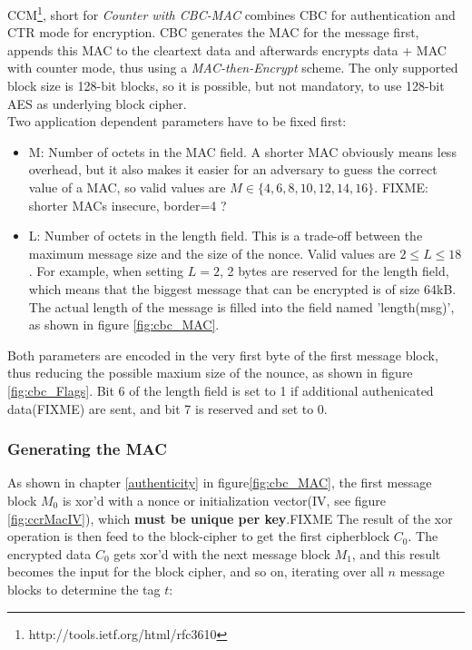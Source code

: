 CCM\footnote{http://tools.ietf.org/html/rfc3610}, short for \textit{Counter with CBC-MAC} combines CBC for authentication and CTR mode for encryption.
CBC generates the MAC for the message first, appends this MAC to the cleartext data and afterwards encrypts data + MAC with counter mode, thus using a
\textit{MAC-then-Encrypt} scheme. The only
supported block size is 128-bit blocks, so it is possible, but not mandatory, to use 128-bit AES as underlying block cipher.
\\
Two application dependent parameters have to be fixed first: 
\begin{itemize}
 \item M: Number of octets in the MAC field. A shorter MAC obviously means less overhead, but it also makes it easier for an adversary to guess the correct
 value of a MAC, so valid values are $M \in \{4, 6, 8, 10, 12, 14, 16\}$. FIXME: shorter MACs insecure, border=4 ? 
 \item L: Number of octets in the length field. This is a trade-off between the maximum message size and the size of the nonce. Valid values are $2 \leq L \leq 18$.
 For example, when setting $L = 2$, 2 bytes are reserved for the length field, which means that the biggest message that can be encrypted is of size 64kB. The actual
 length of the message is filled into the field named 'length(msg)', as shown in figure \ref{fig:cbc_MAC}.
\end{itemize}

Both parameters are encoded in the very first byte of the first message block, thus reducing the possible maxium size of the nounce, as shown in figure \ref{fig:cbc_Flags}.
Bit 6 of the length field is set to 1 if additional authenicated data(FIXME) are sent, and bit 7 is reserved and set to 0.


\subsubsection{Generating the MAC}

As shown in chapter \ref{authenticity} in figure\ref{fig:cbc_MAC}, the first message block $M_0$ is xor'd with a nonce or initialization vector(IV, see figure
\ref{fig:ccrMacIV}), which \textbf{must be unique per key}.FIXME
The result of the xor operation is then feed to the block-cipher to get the first cipherblock $C_0$. The encrypted data $C_0$ gets xor'd with the next message block $M_1$, and this
result becomes the input for the block cipher, and so on, iterating over all $n$ message blocks to determine the tag $t$:

